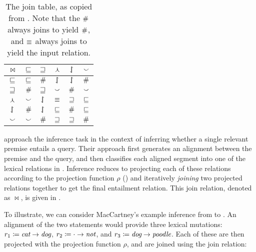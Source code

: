 \begin{table}[t]
	\begin{center}
	\begin{tabular}{|c||c|c|c|c|c|}
    \hline
    $\bowtie$ & $\sqsubseteq$ & $\sqsupseteq$ & $\curlywedge$ & $\downharpoonleft\hspace{-1.25mm}\upharpoonright$ & $\smallsmile$ \\
    \hline
    $\sqsubseteq$ & $\sqsubseteq$ & $\#$ & $\downharpoonleft\hspace{-1.25mm}\upharpoonright$ & $\downharpoonleft\hspace{-1.25mm}\upharpoonright$ & $\#$ \\
    $\sqsupseteq$ & $\#$ & $\sqsupseteq$ & $\smallsmile$ & $\#$ & $\smallsmile$ \\
    $\curlywedge$ & $\smallsmile$ & $\downharpoonleft\hspace{-1.25mm}\upharpoonright$ & $\equiv$ & $\sqsupseteq$ & $\sqsubseteq$ \\
    $\downharpoonleft\hspace{-1.25mm}\upharpoonright$ & $\#$ & $\downharpoonleft\hspace{-1.25mm}\upharpoonright$ & $\sqsubseteq$ & $\#$ & $\sqsubseteq$ \\
    $\smallsmile$ & $\smallsmile$ & $\#$ & $\sqsupseteq$ & $\sqsupseteq$ & $\#$ \\
    \hline
	\end{tabular}
	\caption{
    The join table, as copied from .
    Note that the $\#$ always joins to yield $\#$,
    and $\equiv$ always joins to yield the input relation.
		\label{tab:join}
	}
	\end{center}
\end{table}

 approach the inference task in
  the context of inferring whether a single relevant premise entails
  a query.
Their approach first generates an alignment between the premise
  and the query, and then classifies each aligned segment into one of
  the lexical relations in .
Inference reduces to projecting each of these relations
  according to the projection function $\rho$ () 
  and iteratively \textit{joining}  two projected relations together to 
  get the final entailment relation.
This join relation, denoted as $\bowtie$, is given in .

To illustrate, we can consider MacCartney's example inference from
   to .
An alignment of the two statements would provide three lexical
  mutations:
    \mbox{$r_1\coloneqq\textit{cat}\rightarrow\textit{dog}$}, 
    \mbox{$r_2\coloneqq\cdot\rightarrow\textit{not}$},
    and \mbox{$r_3\coloneqq\textit{dog}\rightarrow\textit{poodle}$}.
Each of these are then projected with the projection function $\rho$,
  and are joined using the join relation:

